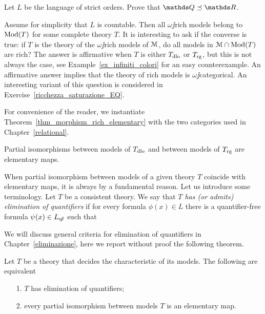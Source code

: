 \documentclass[creche.tex]{subfiles}
\begin{document}
\begin{exercise}
Let $L$ be the language of strict orders. Prove that $\QQ\preceq\RR$.\QED
\end{exercise}

Assume for simplicity that $L$ is countable. Then all $\omega\jj$rich models belong to $\mathop{\rm Mod}(T)$ for some complete theory $T$. It is interesting to ask if the converse is true: if $T$ is the theory of the $\omega\jj$rich models of $\EuScript M$, do all models in $\EuScript M\cap \mathop{\rm Mod}(T)$ are rich?  The answer is affirmative when $T$ is either $T_{\rm dlo}$ or $T_{\rm rg}$, but this is not always the case, see Example~\ref{ex_infiniti_colori} for an easy counterexample. An affirmative answer implies that the theory of rich models is $\omega\jj$categorical. An interesting variant of this question is considered in Exercise~\ref{ricchezza_saturazione_EQ}.

For convenience of the reader, we instantiate Theorem~\ref{thm_morphism_rich_elementary} with the two categories used in Chapter~\ref{relational}.

\begin{corollary}\label{coroll_tutteleimmersionisonoelementari=eliminazioneqantificatori}
Partial isomorphisms between models of $T_{\rm dlo}$ and between models of $T_{\rm rg}$ are elementary maps.\QED
\end{corollary}

When partial isomorphism between models of a given theory $T$ coincide with elementary maps, it is always by a fundamental reason. Let us introduce some terminology. Let $T$ be a consistent theory. We say that \emph{$T$ has (or admits) elimination of quantifiers\/} if for every formula $\phi(x)\in L$ there is a quantifier-free formula $\psi(x)\in L_{\rm qf}$ such that 


We will discuss general criteria for elimination of quantifiers in Chapter~\ref{eliminazione}, here we report without proof the following theorem.

\begin{theorem}\label{thm_tutteleimmersionisonoelementari=eliminazioneqantificatori}
Let $T$ be a theory that decides the characteristic of its models. The following are equivalent
\begin{itemize}
\item[1.] $T$ has elimination of quantifiers;
\item[2.] every partial isomorphism between models $T$ is an elementary map.\QED
\end{itemize}
\end{theorem}
\end{document}
